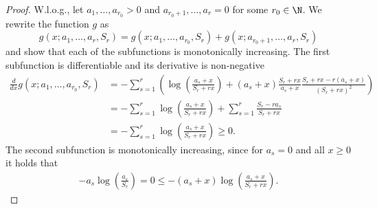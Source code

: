 \begin{proof}
W.l.o.g., let $a_1,\ldots,a_{r_0}>0$ and $a_{r_0+1},\ldots,a_r=0$ for some $r_0\in \N$. We rewrite the function $g$ as
\[g(x;a_1,\ldots,a_r,S_r)=g(x;a_1,\ldots,a_{r_0},S_r)+g(x;a_{r_0+1},\ldots,a_r,S_r)\]
and show that each of  the subfunctions is monotonically increasing.
The first subfunction is differentiable and its derivative is non-negative
\begin{align*}
\frac{d}{dx}g(x;a_1,\ldots,a_{r_0},S_r) &= -\sum_{s=1}^r\left(\log\left(\frac{a_s+x}{S_r+rx}\right)+(a_s+x)\frac{S_r+rx}{a_s+x}\frac{S_r+rx-r(a_s+x)}{(S_r+rx)^2}\right)\\
&= -\sum_{s=1}^r\log\left(\frac{a_s+x}{S_r+rx}\right)+\sum_{s=1}^r\frac{S_r-ra_s}{S_r+rx}\\
&= -\sum_{s=1}^r\log\left(\frac{a_s+x}{S_r+rx}\right)\geq 0.
\end{align*}
The second subfunction is monotonically increasing, since for $a_s=0$ and all $x\geq 0$ it holds that
\begin{align*}
	-a_s\log\left(\frac{a_s}{S_r}\right)=0\leq -(a_s+x)\log\left(\frac{a_s+x}{S_r+rx}\right).
\end{align*}
\end{proof}
\BoundLCT*

